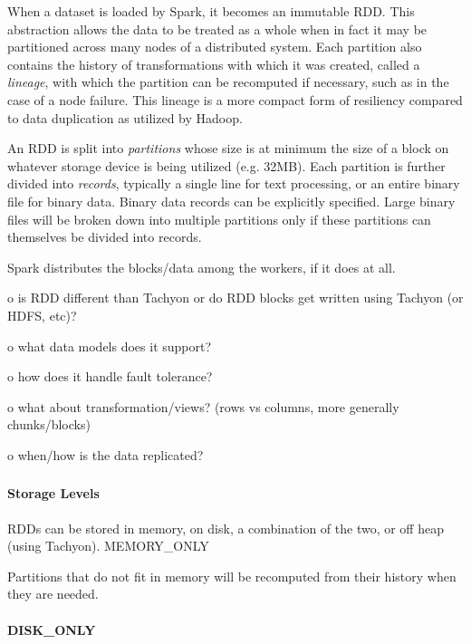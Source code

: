 \documentclass{sig-alternate}
\begin{document}
When a dataset is loaded by Spark, it becomes an immutable RDD. This
abstraction allows the data to be treated as a whole when in fact it may
be partitioned across many nodes of a distributed system. Each partition
also contains the history of transformations with which it was created,
called a \emph{lineage}, with which the partition can be recomputed if
necessary, such as in the case of a node failure. This lineage is a more
compact form of resiliency compared to data duplication as utilized by
Hadoop.

An RDD is split into \emph{partitions} whose size is at minimum the size
of a block on whatever storage device is being utilized (e.g. 32MB).
Each partition is further divided into \emph{records}, typically a
single line for text processing, or an entire binary file for binary
data. Binary data records can be explicitly specified. Large binary
files will be broken down into multiple partitions only if these
partitions can themselves be divided into records.

Spark distributes the blocks/data among the workers, if it does at all.

o is RDD different than Tachyon or do RDD blocks get written using
Tachyon (or HDFS, etc)?

o what data models does it support?

o how does it handle fault tolerance?

o what about transformation/views? (rows vs columns, more generally
chunks/blocks)

o when/how is the data replicated?

\subsubsection{}\label{section}

\paragraph{Storage Levels}\label{storage-levels}

RDDs can be stored in memory, on disk, a combination of the two, or off
heap (using Tachyon). MEMORY\_ONLY

Partitions that do not fit in memory will be recomputed from their
history when they are needed.

\paragraph{DISK\_ONLY}\label{diskux5fonly}
\end{document}
